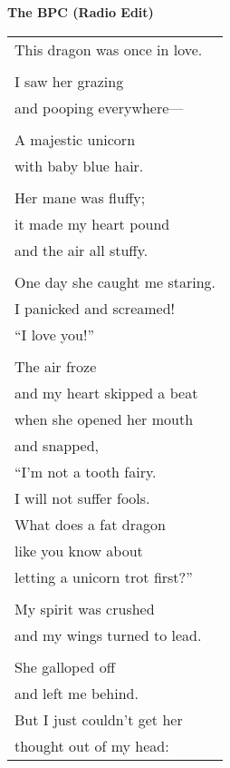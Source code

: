 \documentclass{article}
\begin{document}
\newcommand{\h}{\hspace*{2ex}}
\newcommand{\HHHH}{\hspace*{32ex}}

\begin{center}
\large\textbf{The BPC (Radio Edit)}\hspace*{15ex}
\end{center}
\begin{center}
\begin{tabular}{l}
\\
This dragon was once in love. \\
\\
I saw her grazing \\
and pooping everywhere--- \\
\\
A majestic unicorn \\
with baby blue hair. \\
\\
Her mane was fluffy; \\
it made my heart pound \\
and the air all stuffy. \\
\\
One day she caught me staring. \\
I panicked and screamed! \\
\h``I love you!'' \\
\\
The air froze \\
and my heart skipped a beat \\
when she opened her mouth \\
and snapped, \\
\h``I'm not a tooth fairy. \\
\h I will not suffer fools. \\
\h What does a fat dragon \\
\h like you know about \\
\h letting a unicorn trot first?'' \\
\\
My spirit was crushed \\
and my wings turned to lead. \\
\\
She galloped off \\
and left me behind. \\
But I just couldn't get her \\
thought out of my head: \\

\end{tabular}
\end{center}
\end{document}
